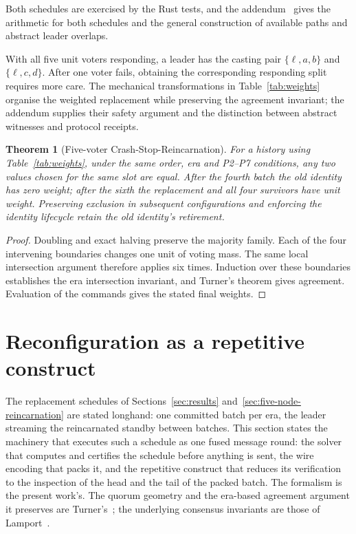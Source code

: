 \documentclass[10pt,journal,letterpaper]{IEEEtran}
\newtheorem{theorem}{Theorem}
\begin{document}
Both schedules are exercised by the Rust tests, and the addendum~\cite{artifact} gives the arithmetic for both schedules and the general construction of available paths and abstract leader overlaps.

With all five unit voters responding, a leader has the casting pair $\{\ell,a,b\}$ and $\{\ell,c,d\}$. After one voter fails, obtaining the corresponding responding split requires more care. The mechanical transformations in Table~\ref{tab:weights} organise the weighted replacement while preserving the agreement invariant; the addendum supplies their safety argument and the distinction between abstract witnesses and protocol receipts.

\begin{theorem}[Five-voter Crash-Stop-Reincarnation]\label{thm:replacement}
For a history using Table~\ref{tab:weights}, under the same order, era and P2--P7 conditions, any two values chosen for the same slot are equal. After the fourth batch the old identity has zero weight; after the sixth the replacement and all four survivors have unit weight. Preserving exclusion in subsequent configurations and enforcing the identity lifecycle retain the old identity's retirement.
\end{theorem}
\begin{proof}
Doubling and exact halving preserve the majority family. Each of the four intervening boundaries changes one unit of voting mass. The same local intersection argument therefore applies six times. Induction over these boundaries establishes the era intersection invariant, and Turner's theorem gives agreement. Evaluation of the commands gives the stated final weights.
\end{proof}

\section{Reconfiguration as a repetitive construct}\label{sec:solver}
The replacement schedules of Sections~\ref{sec:results} and~\ref{sec:five-node-reincarnation} are stated longhand: one committed batch per era, the leader streaming the reincarnated standby between batches. This section states the machinery that executes such a schedule as one fused message round: the solver that computes and certifies the schedule before anything is sent, the wire encoding that packs it, and the repetitive construct that reduces its verification to the inspection of the head and the tail of the packed batch. The formalism is the present work's. The quorum geometry and the era-based agreement argument it preserves are Turner's~\cite{turner}; the underlying consensus invariants are those of Lamport~\cite{pms}.
\end{document}
